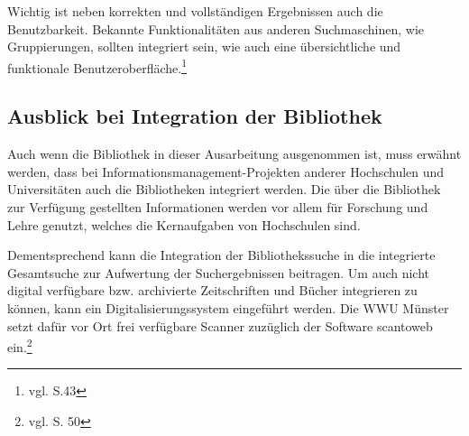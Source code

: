 Wichtig ist neben korrekten und vollständigen Ergebnissen auch die Benutzbarkeit. Bekannte Funktionalitäten aus anderen Suchmaschinen, wie Gruppierungen, sollten integriert sein, wie auch eine übersichtliche und funktionale Benutzeroberfläche.\footnote{vgl. \cite{vogl_fortschritte_2012} S.43} 

\subsection{Ausblick bei Integration der Bibliothek}
Auch wenn die Bibliothek in dieser Ausarbeitung ausgenommen ist, muss erwähnt werden, dass bei Informationsmanagement-Projekten anderer Hochschulen und Universitäten auch die Bibliotheken integriert werden. Die über die Bibliothek zur Verfügung gestellten Informationen werden vor allem für Forschung und Lehre genutzt, welches die Kernaufgaben von Hochschulen sind.

Dementsprechend kann die Integration der Bibliothekssuche in die integrierte Gesamtsuche zur Aufwertung der Suchergebnissen beitragen. Um auch nicht digital verfügbare bzw. archivierte Zeitschriften und Bücher integrieren zu können, kann ein Digitalisierungssystem eingeführt werden. Die WWU Münster setzt dafür vor Ort frei verfügbare Scanner zuzüglich der Software scantoweb ein.\footnote{vgl. \cite{vogl_fortschritte_2012} S. 50}
